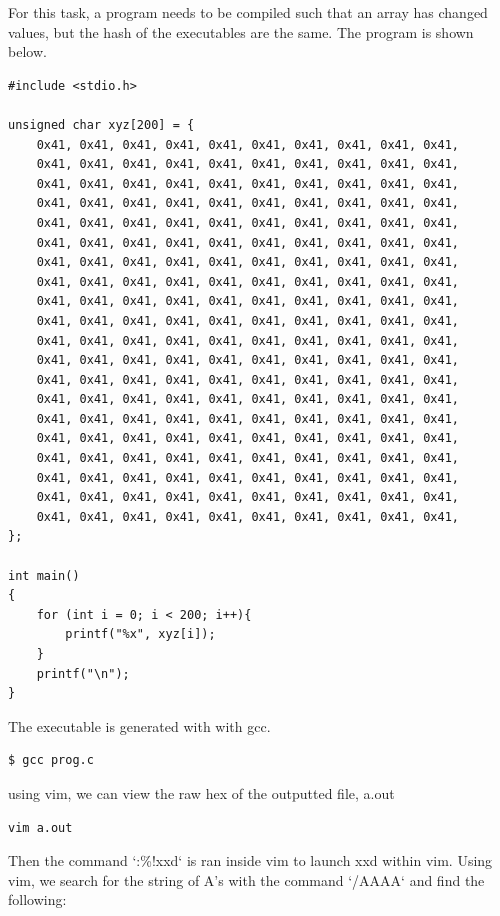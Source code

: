 \documentclass[12pt]{article}
\begin{document}
For this task, a program needs to be compiled such that an array has changed values, but the hash of the executables are the same. The program is shown below.

\begin{verbatim}
#include <stdio.h>

unsigned char xyz[200] = {
	0x41, 0x41, 0x41, 0x41, 0x41, 0x41, 0x41, 0x41, 0x41, 0x41,
	0x41, 0x41, 0x41, 0x41, 0x41, 0x41, 0x41, 0x41, 0x41, 0x41,
	0x41, 0x41, 0x41, 0x41, 0x41, 0x41, 0x41, 0x41, 0x41, 0x41,
	0x41, 0x41, 0x41, 0x41, 0x41, 0x41, 0x41, 0x41, 0x41, 0x41,
	0x41, 0x41, 0x41, 0x41, 0x41, 0x41, 0x41, 0x41, 0x41, 0x41,
	0x41, 0x41, 0x41, 0x41, 0x41, 0x41, 0x41, 0x41, 0x41, 0x41,
	0x41, 0x41, 0x41, 0x41, 0x41, 0x41, 0x41, 0x41, 0x41, 0x41,
	0x41, 0x41, 0x41, 0x41, 0x41, 0x41, 0x41, 0x41, 0x41, 0x41,
	0x41, 0x41, 0x41, 0x41, 0x41, 0x41, 0x41, 0x41, 0x41, 0x41,
	0x41, 0x41, 0x41, 0x41, 0x41, 0x41, 0x41, 0x41, 0x41, 0x41,
	0x41, 0x41, 0x41, 0x41, 0x41, 0x41, 0x41, 0x41, 0x41, 0x41,
	0x41, 0x41, 0x41, 0x41, 0x41, 0x41, 0x41, 0x41, 0x41, 0x41,
	0x41, 0x41, 0x41, 0x41, 0x41, 0x41, 0x41, 0x41, 0x41, 0x41,
	0x41, 0x41, 0x41, 0x41, 0x41, 0x41, 0x41, 0x41, 0x41, 0x41,
	0x41, 0x41, 0x41, 0x41, 0x41, 0x41, 0x41, 0x41, 0x41, 0x41,
	0x41, 0x41, 0x41, 0x41, 0x41, 0x41, 0x41, 0x41, 0x41, 0x41,
	0x41, 0x41, 0x41, 0x41, 0x41, 0x41, 0x41, 0x41, 0x41, 0x41,
	0x41, 0x41, 0x41, 0x41, 0x41, 0x41, 0x41, 0x41, 0x41, 0x41,
	0x41, 0x41, 0x41, 0x41, 0x41, 0x41, 0x41, 0x41, 0x41, 0x41,
	0x41, 0x41, 0x41, 0x41, 0x41, 0x41, 0x41, 0x41, 0x41, 0x41,
};

int main()
{
	for (int i = 0; i < 200; i++){
		printf("%x", xyz[i]);
	}
	printf("\n");
}
\end{verbatim}

The executable is generated with with gcc.

\begin{verbatim}
$ gcc prog.c
\end{verbatim}

using vim, we can view the raw hex of the outputted file, a.out

\begin{verbatim}
vim a.out
\end{verbatim}

Then the command `:\%!xxd` is ran inside vim to launch xxd within vim. Using vim, we search for the string of A's with the command `/AAAA` and find the following:
\end{document}
